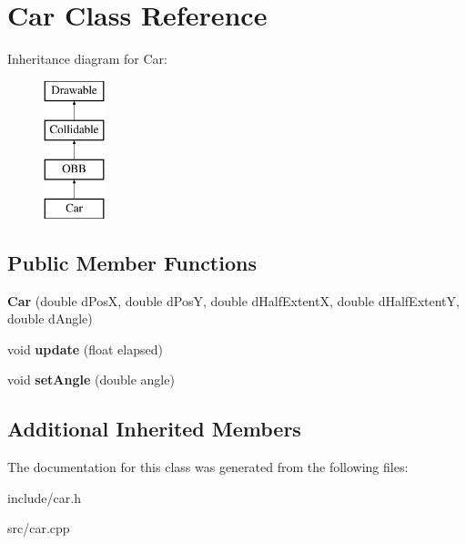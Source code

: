 \hypertarget{class_car}{}\section{Car Class Reference}
\label{class_car}
Inheritance diagram for Car\+:\begin{figure}[H]
\begin{center}
\leavevmode
\includegraphics[height=4.000000cm]{class_car}
\end{center}
\end{figure}
\subsection*{Public Member Functions}
\begin{DoxyCompactItemize}
\item 
\hypertarget{class_car_abf11f99802806a2fe70fefb90173a98f}{}{\bfseries Car} (double d\+Pos\+X, double d\+Pos\+Y, double d\+Half\+Extent\+X, double d\+Half\+Extent\+Y, double d\+Angle)\label{class_car_abf11f99802806a2fe70fefb90173a98f}

\item 
\hypertarget{class_car_ab7860fcfd5e75787d358128e04442464}{}void {\bfseries update} (float elapsed)\label{class_car_ab7860fcfd5e75787d358128e04442464}

\item 
\hypertarget{class_car_ad8fce46167e6bdbb9f91ca8669da63e3}{}void {\bfseries set\+Angle} (double angle)\label{class_car_ad8fce46167e6bdbb9f91ca8669da63e3}

\end{DoxyCompactItemize}
\subsection*{Additional Inherited Members}


The documentation for this class was generated from the following files\+:\begin{DoxyCompactItemize}
\item 
include/car.\+h\item 
src/car.\+cpp\end{DoxyCompactItemize}
